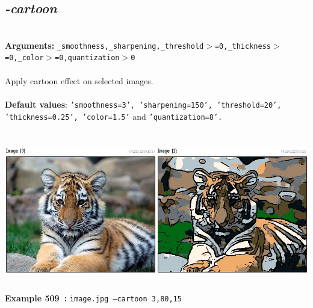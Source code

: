 \documentclass[a4paper,11pt,twoside]{book}
\begin{document}
\subsection{\emph{-cartoon} }\vspace*{-0.5em}
~\\\textbf{Arguments: } 
{\small \texttt{\_smoothness,\_sharpening,\_threshold$>$=0,\_thickness$>$=0,\_color$>$=0,quantization$>$0}}\\~\\
Apply cartoon effect on selected images.
~\\~\\\textbf{Default values}: {\small \texttt{'smoothness=3', 'sharpening=150', 'threshold=20', 'thickness=0.25', 'color=1.5'} and \texttt{'quantization=8'.}}
\begin{center}\includegraphics[keepaspectratio=true,height=7cm,width=\textwidth]{img/gmic_def509.jpg}\\
{\footnotesize \textbf{Example 509~:} \texttt{image.jpg --cartoon 3,80,15}}
\end{center}
\end{document}
